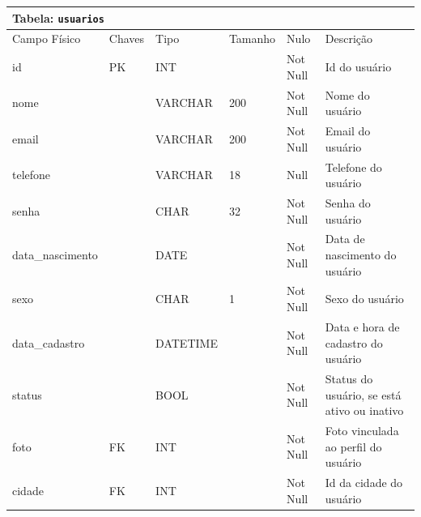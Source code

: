 \documentclass[12pt,a4paper]{article}
\begin{document}
\begin{center}
\begin{table}[h!]
	\label{tabela:exemplo}
	\begin{tabular}{|p{2.5cm}|p{1cm}|p{1.25cm}|p{1.75cm}|p{1.25cm}|p{5cm}|}\hline	
		\multicolumn{6}{|p{16cm}|}{\cellcolor{cinzaClaro}  \centering Tabela: \texttt{usuarios}} \\ \hline %
		{\small Campo Físico}   & {\small Chaves} & {\small Tipo} & {\small Tamanho} & {\small Nulo} & {\small Descrição}\\\hline %
		
		{\tiny id} & {\tiny PK} & {\tiny INT} & {\tiny } & {\tiny Not Null} &{\tiny Id do usuário}\\\hline
		{\tiny nome} & {\tiny } & {\tiny VARCHAR} & {\tiny 200} & {\tiny Not Null} &{\tiny  Nome do usuário}\\\hline
		{\tiny email} & {\tiny } & {\tiny VARCHAR} & {\tiny 200} & {\tiny Not Null} &{\tiny Email do usuário}\\\hline
		{\tiny telefone} & {\tiny } & {\tiny VARCHAR } & {\tiny 18} & {\tiny  Null} &{\tiny Telefone do usuário}\\\hline
		{\tiny senha} & {\tiny } & {\tiny CHAR} & {\tiny 32} & {\tiny Not Null} &{\tiny Senha do usuário}\\\hline
		{\tiny data\_nascimento} & {\tiny } & {\tiny DATE} & {\tiny } & {\tiny Not Null} &{\tiny Data de nascimento do usuário}\\\hline
		{\tiny sexo} & {\tiny } & {\tiny CHAR} & {\tiny 1} & {\tiny Not Null} &{\tiny Sexo do usuário}\\\hline
		{\tiny data\_cadastro} & {\tiny } & {\tiny DATETIME} & {\tiny } & {\tiny Not Null} &{\tiny Data e hora de cadastro do usuário}\\\hline
		{\tiny status} & {\tiny } & {\tiny BOOL} & {\tiny } & {\tiny Not Null} &{\tiny Status do usuário, se está ativo ou inativo}\\\hline		
		{\tiny foto} & {\tiny FK} & {\tiny INT} & {\tiny } & {\tiny Not Null} &{\tiny Foto vinculada ao perfil do usuário}\\\hline
		{\tiny cidade} & {\tiny FK} & {\tiny INT} & {\tiny } & {\tiny Not Null} &{\tiny Id da cidade do usuário}\\\hline
		
			
	\end{tabular}
\end{table}	
\end{center}
\end{document}
